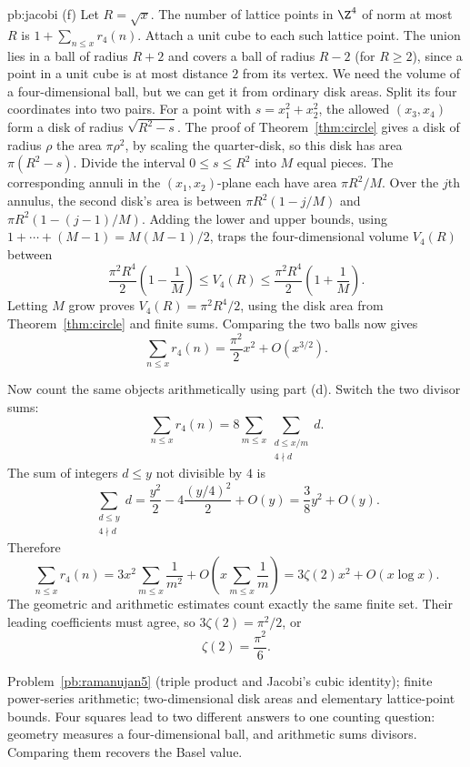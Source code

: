\begin{solution}{pb:jacobi}
(f) Let $R=\sqrt{x}$. The number of lattice points in $\Z^4$ of norm at most $R$ is $1+\sum_{n\le x}r_4(n)$. Attach a unit cube to each such lattice point. The union lies in a ball of radius $R+2$ and covers a ball of radius $R-2$ (for $R\ge2$), since a point in a unit cube is at most distance $2$ from its vertex. We need the volume of a four-dimensional ball, but we can get it from
ordinary disk areas. Split its four coordinates into two pairs.
For a point with $s=x_1^2+x_2^2$, the allowed $(x_3,x_4)$ form
a disk of radius $\sqrt{R^2-s}$. The proof of Theorem~\ref{thm:circle} gives a disk of radius $\rho$ the area $\pi\rho^2$, by scaling the quarter-disk, so this disk has area $\pi(R^2-s)$.
Divide the interval $0\le s\le R^2$ into $M$ equal pieces.
The corresponding annuli in the $(x_1,x_2)$-plane
each have area $\pi R^2/M$.
Over the $j$th annulus, the second disk's area is between
$\pi R^2(1-j/M)$ and $\pi R^2(1-(j-1)/M)$.
Adding the lower and upper bounds, using
$1+\cdots+(M-1)=M(M-1)/2$, traps the four-dimensional volume $V_4(R)$ between
\[
\frac{\pi^2R^4}2\left(1-\frac1M\right)
\le V_4(R)\le
\frac{\pi^2R^4}2\left(1+\frac1M\right).
\]
Letting $M$ grow proves $V_4(R)=\pi^2R^4/2$,
using the disk area from Theorem~\ref{thm:circle} and finite sums.
Comparing the two balls now gives
\[
\sum_{n\le x}r_4(n)
=\frac{\pi^2}{2}x^2+O(x^{3/2}).
\]

Now count the same objects arithmetically using part (d). Switch the two divisor sums:
\[
\sum_{n\le x}r_4(n)
=8\sum_{m\le x}\sum_{\substack{d\le x/m\\4\nmid d}}d.
\]
The sum of integers $d\le y$ not divisible by $4$ is
\[
\sum_{\substack{d\le y\\4\nmid d}}d
=\frac{y^2}{2}-4\frac{(y/4)^2}{2}+O(y)
=\frac38y^2+O(y).
\]
Therefore
\[
\sum_{n\le x}r_4(n)
=3x^2\sum_{m\le x}\frac1{m^2}
 +O\left(x\sum_{m\le x}\frac1m\right)
=3\zeta(2)x^2+O(x\log x).
\]
The geometric and arithmetic estimates count exactly the same finite set. Their leading coefficients must agree, so
$3\zeta(2)=\pi^2/2$, or
\[
\boxed{\zeta(2)=\frac{\pi^2}{6}}.
\]

\tools Problem~\ref{pb:ramanujan5} (triple product and Jacobi's cubic identity); finite power-series arithmetic; two-dimensional disk areas and elementary lattice-point bounds.
\leads Four squares lead to two different answers to one counting question: geometry measures a four-dimensional ball, and arithmetic sums divisors. Comparing them recovers the Basel value.
\end{solution}

